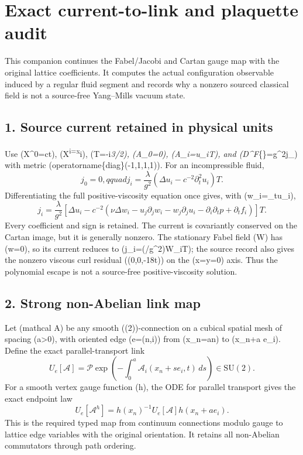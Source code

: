 \section{Exact current-to-link and plaquette
audit}\label{fabel-current-to-lattice-audit-md-exact-current-to-link-and-plaquette-audit}

This companion continues the Fabel/Jacobi and Cartan gauge map with the
original lattice coefficients. It computes the actual configuration
observable induced by a regular fluid segment and records why a nonzero
sourced classical field is not a source-free Yang--Mills vacuum state.

\subsection{1. Source current retained in physical
units}\label{fabel-current-to-lattice-audit-md-source-current-retained-in-physical-units}

Use (X\^{}0=ct), (X\textsuperscript{i=x}i), (T=-i\sigma\emph{3/2),
(A\_0=0), (A\_i=\lambda u\_iT), and (D\^{}\mu F}\{\mu\nu\}=g\^{}2j\_\nu)
with metric (operatorname\{diag\}(-1,1,1,1)). For an incompressible
fluid, \[
j_0=0,qquad
j_i=\frac{\lambda}{g^2}\left(\Delta u_i-c^{-2}\partial_t^2u_i\right)T.
\] Differentiating the full positive-viscosity equation once gives, with
(w\_i=\partial\_tu\_i), \[
j_i=\frac{\lambda}{g^2}\left[\Delta u_i-c^{-2}\left(\nu\Delta w_i-u_j\partial_jw_i-w_j\partial_ju_i-\partial_i\partial_tp+\partial_tf_i\right)\right]T.
\] Every coefficient and sign is retained. The current is covariantly
conserved on the Cartan image, but it is generally nonzero. The
stationary Fabel field (W) has (w=0), so its current reduces to
(j\_i=(\lambda/g\^{}2)\Delta W\_iT); the source record also gives the
nonzero viscous curl residual ((0,0,-18\nu t)) on the (x=y=0) axis. Thus
the polynomial escape is not a source-free positive-viscosity solution.

\subsection{2. Strong non-Abelian link
map}\label{fabel-current-to-lattice-audit-md-strong-non-abelian-link-map}

Let (mathcal A) be any smooth ((2))-connection on a cubical
spatial mesh of spacing (a\textgreater0), with oriented edge (e=(n,i))
from (x\_n=an) to (x\_n+a e\_i). Define the exact parallel-transport
link \[
U_e[\mathcal A]=\mathcal P\exp\left(-\int_0^a\mathcal A_i(x_n+s e_i,t)\,ds\right)\in\mathrm{SU}(2).
\] For a smooth vertex gauge function (h), the ODE for parallel
transport gives the exact endpoint law \[
U_e[\mathcal A^h]=h(x_n)^{-1}U_e[\mathcal A]h(x_n+a e_i).
\] This is the required typed map from continuum connections modulo
gauge to lattice edge variables with the original orientation. It
retains all non-Abelian commutators through path ordering.

